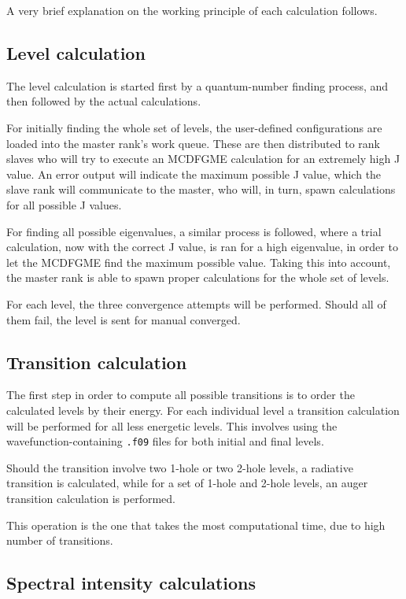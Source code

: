A very brief explanation on the working principle of each calculation follows.



\subsection{Level calculation}

The level calculation is started first by a quantum-number finding process, and then followed by the actual calculations.

For initially finding the whole set of levels, the user-defined configurations are loaded into the master rank's work queue. These are then distributed to rank slaves who will try to execute an \gls{MCDFGME} calculation for an extremely high J value. An error output will indicate the maximum possible J value, which the slave rank will communicate to the master, who will, in turn, spawn calculations for all possible J values.

For finding all possible eigenvalues, a similar process is followed, where a trial calculation, now with the correct J value, is ran for a high eigenvalue, in order to let the \gls{MCDFGME} find the maximum possible value. Taking this into account, the master rank is able to spawn proper calculations for the whole set of levels.

For each level, the three convergence attempts will be performed. Should all of them fail, the level is sent for manual converged.

\subsection{Transition calculation}

The first step in order to compute all possible transitions is to order the calculated levels by their energy. For each individual level a transition calculation will be performed for all less energetic levels. This involves using the wavefunction-containing \verb|.f09| files for both initial and final levels.

Should the transition involve two 1-hole or two 2-hole levels, a radiative transition is calculated, while for a set of 1-hole and 2-hole levels, an auger transition calculation is performed.

This operation is the one that takes the most computational time, due to high number of transitions.

\subsection{Spectral intensity calculations}

